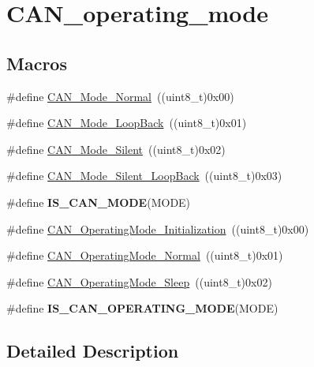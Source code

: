 \hypertarget{group___c_a_n__operating__mode}{\section{C\-A\-N\-\_\-operating\-\_\-mode}
\label{group___c_a_n__operating__mode}
}
\subsection*{Macros}
\begin{DoxyCompactItemize}
\item 
\#define \hyperlink{group___c_a_n__operating__mode_gaaf1f48ab4917ccfd5fd31dd781d59e29}{C\-A\-N\-\_\-\-Mode\-\_\-\-Normal}~((uint8\-\_\-t)0x00)
\item 
\#define \hyperlink{group___c_a_n__operating__mode_gaad036c944403186eb3496ff65020c0ee}{C\-A\-N\-\_\-\-Mode\-\_\-\-Loop\-Back}~((uint8\-\_\-t)0x01)
\item 
\#define \hyperlink{group___c_a_n__operating__mode_gac05e5d666f18eb35e8da70e6e17e8fb8}{C\-A\-N\-\_\-\-Mode\-\_\-\-Silent}~((uint8\-\_\-t)0x02)
\item 
\#define \hyperlink{group___c_a_n__operating__mode_ga087afa0d24d2cf399225993573c984eb}{C\-A\-N\-\_\-\-Mode\-\_\-\-Silent\-\_\-\-Loop\-Back}~((uint8\-\_\-t)0x03)
\item 
\#define {\bfseries I\-S\-\_\-\-C\-A\-N\-\_\-\-M\-O\-D\-E}(M\-O\-D\-E)
\item 
\#define \hyperlink{group___c_a_n__operating__mode_gace8a4b5c164aba6f473d6254ad1e8a36}{C\-A\-N\-\_\-\-Operating\-Mode\-\_\-\-Initialization}~((uint8\-\_\-t)0x00)
\item 
\#define \hyperlink{group___c_a_n__operating__mode_ga663ecffaa60d1a201a035dfa45325848}{C\-A\-N\-\_\-\-Operating\-Mode\-\_\-\-Normal}~((uint8\-\_\-t)0x01)
\item 
\#define \hyperlink{group___c_a_n__operating__mode_ga173b85d2baaa6249d966b8073e3ad8ca}{C\-A\-N\-\_\-\-Operating\-Mode\-\_\-\-Sleep}~((uint8\-\_\-t)0x02)
\item 
\#define {\bfseries I\-S\-\_\-\-C\-A\-N\-\_\-\-O\-P\-E\-R\-A\-T\-I\-N\-G\-\_\-\-M\-O\-D\-E}(M\-O\-D\-E)
\end{DoxyCompactItemize}


\subsection{Detailed Description}


